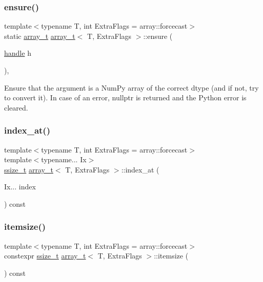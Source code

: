 \subsubsection{\texorpdfstring{ensure()}{ensure()}}
{\footnotesize\ttfamily template$<$typename T, int Extra\+Flags = array\+::forcecast$>$ \\
static \mbox{\hyperlink{classarray__t}{array\+\_\+t}} \mbox{\hyperlink{classarray__t}{array\+\_\+t}}$<$ T, Extra\+Flags $>$\+::ensure (\begin{DoxyParamCaption}\item[{\mbox{\hyperlink{classhandle}{handle}}}]{h }\end{DoxyParamCaption})\hspace{0.3cm}{\ttfamily [inline]}, {\ttfamily [static]}}

Ensure that the argument is a Num\+Py array of the correct dtype (and if not, try to convert it). In case of an error, nullptr is returned and the Python error is cleared. \mbox{\label{classarray__t_a3702471be3f9fc83f0e96a6a9807388b}} 
\subsubsection{\texorpdfstring{index\_at()}{index\_at()}}
{\footnotesize\ttfamily template$<$typename T, int Extra\+Flags = array\+::forcecast$>$ \\
template$<$typename... Ix$>$ \\
\mbox{\hyperlink{detail_2common_8h_ac430d16fc097b3bf0a7469cfd09decda}{ssize\+\_\+t}} \mbox{\hyperlink{classarray__t}{array\+\_\+t}}$<$ T, Extra\+Flags $>$\+::index\+\_\+at (\begin{DoxyParamCaption}\item[{Ix...}]{index }\end{DoxyParamCaption}) const\hspace{0.3cm}{\ttfamily [inline]}}

\mbox{\label{classarray__t_a59865c505f703937ca2b021e9e9b7a35}} 
\subsubsection{\texorpdfstring{itemsize()}{itemsize()}}
{\footnotesize\ttfamily template$<$typename T, int Extra\+Flags = array\+::forcecast$>$ \\
constexpr \mbox{\hyperlink{detail_2common_8h_ac430d16fc097b3bf0a7469cfd09decda}{ssize\+\_\+t}} \mbox{\hyperlink{classarray__t}{array\+\_\+t}}$<$ T, Extra\+Flags $>$\+::itemsize (\begin{DoxyParamCaption}{ }\end{DoxyParamCaption}) const\hspace{0.3cm}{\ttfamily [inline]}}

